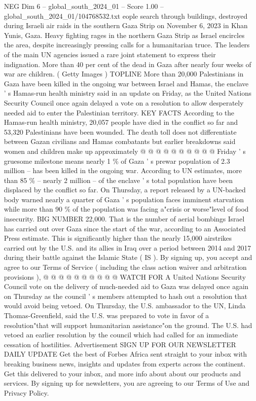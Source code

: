 \begin{textsample}{NEG Dim 6 – global\_south\_2024\_01 – Score 1.00 – global\_south\_2024\_01/104768532.txt}  \label{ex:f6_neg_350}
eople search through buildings, destroyed during Israeli air raids in the southern Gaza Strip on November 6, 2023 in Khan Yunis, Gaza.
Heavy fighting rages in the northern Gaza Strip as Israel encircles the area, despite increasingly pressing calls for a humanitarian truce.
The leaders of the main UN agencies issued a rare joint statement to express their indignation.
More than 40 per cent of the dead in Gaza after nearly four weeks of war are children. ( Getty Images ) TOPLINE More than 20,000 Palestinians in Gaza have been killed in the ongoing war between Israel and Hamas, the enclave ' s Hamas-run health ministry said in an update on Friday, as the United Nations Security Council once again delayed a vote on a resolution to allow desperately needed aid to enter the Palestinian territory.
KEY FACTS According to the Hamas-run health ministry, 20,057 people have died in the conflict so far and 53,320 Palestinians have been wounded.
The death toll does not differentiate between Gazan civilians and Hamas combatants but earlier breakdowns said women and children make up approximately @ @ @ @ @ @ @ @ @ @ Friday ' s gruesome milestone means nearly 1 \% of Gaza ' s prewar population of 2.3 million -- has been killed in the ongoing war.
According to UN estimates, more than 85 \% -- nearly 2 million -- of the enclave ' s total population have been displaced by the conflict so far.
On Thursday, a report released by a UN-backed body warned nearly a quarter of Gaza ' s population faces imminent starvation while more than 90 \% of the population was facing a"crisis or worse"level of food insecurity.
BIG NUMBER 22,000.
That is the number of aerial bombings Israel has carried out over Gaza since the start of the war, according to an Associated Press estimate.
This is significantly higher than the nearly 15,000 airstrikes carried out by the U.S. and its allies in Iraq over a period between 2014 and 2017 during their battle against the Islamic State ( IS ).
By signing up, you accept and agree to our Terms of Service ( including the class action waiver and arbitration provisions ), @ @ @ @ @ @ @ @ @ @ WATCH FOR A United Nations Security Council vote on the delivery of much-needed aid to Gaza was delayed once again on Thursday as the council ' s members attempted to hash out a resolution that would avoid being vetoed.
On Thursday, the U.S. ambassador to the UN, Linda Thomas-Greenfield, said the U.S. was prepared to vote in favor of a resolution"that will support humanitarian assistance"on the ground.
The U.S. had vetoed an earlier resolution by the council which had called for an immediate cessation of hostilities.
Advertisement SIGN UP FOR OUR NEWSLETTER DAILY UPDATE Get the best of Forbes Africa sent straight to your inbox with breaking business news, insights and updates from experts across the continent.
Get this delivered to your inbox, and more info about about our products and services.
By signing up for newsletters, you are agreeing to our Terms of Use and Privacy Policy.

\end{textsample}
